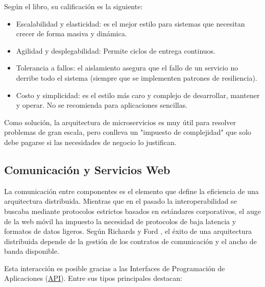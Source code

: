 \begin{itemize}
    Según el libro, su calificación es la siguiente:

    \begin{itemize}
        \item Escalabilidad y elasticidad: es el mejor estilo para sistemas que necesitan crecer de forma masiva y dinámica.
        \item Agilidad y desplegabilidad: Permite ciclos de entrega continuos.
        \item Tolerancia a fallos: el aislamiento asegura que el fallo de un servicio no derribe todo el sistema (siempre 
        que se implementen patrones de resiliencia).
        \item Costo y simplicidad: es el estilo más caro y complejo de desarrollar, mantener y operar. No se recomienda 
        para aplicaciones sencillas.
    \end{itemize}

    Como solución, la arquitectura de microservicios es muy útil para resolver problemas de gran escala, pero conlleva un "impuesto de 
    complejidad" que solo debe pagarse si las necesidades de negocio lo justifican.
\end{itemize}

\subsection{Comunicación y Servicios Web}

La comunicación entre componentes es el elemento que define la eficiencia de una arquitectura distribuida. Mientras que en el pasado 
la interoperabilidad se buscaba mediante protocolos estrictos basados en estándares corporativos, el auge de la web móvil ha impuesto 
la necesidad de protocolos de baja latencia y formatos de datos ligeros. Según Richards y Ford \cite{libroArquitecturasSoftware}, el 
éxito de una arquitectura distribuida depende de la gestión de los contratos de comunicación y el ancho de banda disponible.

Esta interacción es posible gracias a las Interfaces de Programación de Aplicaciones (\hyperlink{api}{API}). Entre sus tipos principales 
destacan:

